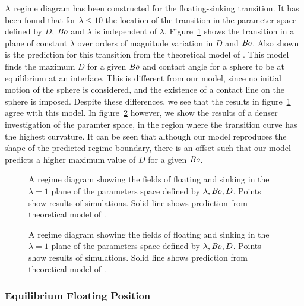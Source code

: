 \documentclass[12pt]{article}
\newcommand\Bo{\mbox{\textit{Bo}}}  %
\begin{document}
A regime diagram has been constructed for the floating-sinking transition. It has been found that for $\lambda \leq 10$ the location of the transition in the parameter space defined by $D$, $\Bo$ and $\lambda$ is independent of $\lambda$. Figure~\ref{fig:regime} shows the transition in a plane of constant $\lambda$ over orders of magnitude variation in $D$ and $\Bo$. Also shown is the prediction for this transition from the theoretical model of \citep{Vella06}. This model finds the maximum $D$ for a given $\Bo$ and contact angle for a sphere to be at equilibrium at an interface. This is different from our model, since no initial motion of the sphere is considered, and the existence of a contact line on the sphere is imposed. Despite these differences, we see that the results in figure~\ref{fig:regime} agree with this model. In figure~\ref{fig:zoom_regime} however, we show the results of a denser investigation of the paramter space, in the region where the transition curve has the highest curvature. It can be seen that although our model reproduces the shape of the predicted regime boundary, there is an offset such that our model predicts a higher maximum value of $D$ for a given $\Bo$.

  \begin{figure}
    \resizebox{0.9\textwidth}{!}{\large }
    \caption{A regime diagram showing the fields of floating and sinking in the $\lambda = 1$ plane of the parameters space defined by ${\lambda, \Bo, D}$. Points show results of simulations. Solid line shows prediction from theoretical model of \citep{Vella06}.\label{fig:regime}}
  \end{figure}

  \begin{figure}
    \resizebox{0.9\textwidth}{!}{\large }
    \caption{A regime diagram showing the fields of floating and sinking in the $\lambda = 1$ plane of the parameters space defined by ${\lambda, \Bo, D}$. Points show results of simulations. Solid line shows prediction from theoretical model of \citep{Vella06}.\label{fig:zoom_regime}}
  \end{figure}

\subsubsection{Equilibrium Floating Position}
\label{subsubsec:equilib_pos}
\end{document}
